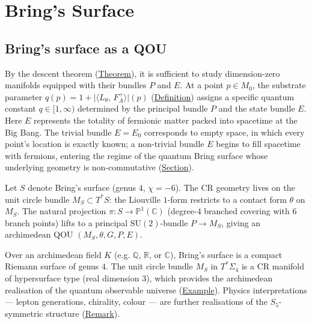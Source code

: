 \chapter{Bring's Surface}
\label{chap:brings-surface}

\section{Bring's surface as a QOU}
\label{sec:brings-qou}

\begin{remark}
  \label{rem:descent-to-zero}
By the descent theorem (\hyperref[thm:descartes]{Theorem}), it is sufficient
to study dimension-zero manifolds equipped with their bundles $P$ and $E$.
At a point $p\in M_0$, the substrate parameter
$q(p)= 1 + \lvert\langle L_\theta,\, F_A^{+}\rangle\rvert(p)$
(\hyperref[def:substrate-parameter]{Definition}) assigns a specific quantum
constant $q\in[1,\infty)$ determined by the principal bundle $P$ and the
state bundle $E$.  Here $E$ represents the totality of fermionic matter
packed into spacetime at the Big Bang.  The trivial bundle $E=E_0$
corresponds to empty space, in which every point's location is exactly
known; a non-trivial bundle $E$ begins to fill spacetime with fermions,
entering the regime of the quantum Bring surface whose underlying geometry
is non-commutative (\hyperref[sec:quantum-brings]{Section}).
\end{remark}

\begin{example}
  \label{ex:brings-surface}
Let $S$ denote Bring's surface (genus $4$, $\chi = -6$).  The CR geometry
lives on the unit circle bundle $M_S \subset T^*S$: the Liouville
$1$-form restricts to a contact form $\theta$ on $M_S$.  The natural
projection $\pi \colon S \to \mathbb{P}^1(\mathbb{C})$ (degree-$4$
branched covering with $6$ branch points) lifts to a principal
$\mathrm{SU}(2)$-bundle $P \to M_S$, giving an archimedean QOU
$(M_S, \theta, G, P, E)$.
\end{example}

\begin{remark}
  \label{rem:brings-realisations}
Over an archimedean field $K$ (e.g. $\mathbb{Q}$, $\mathbb{R}$, or
$\mathbb{C}$), Bring's surface is a compact Riemann surface of genus $4$.
The unit circle bundle $M_S$ in $T^*\Sigma_4$ is a CR manifold of
hypersurface type (real dimension $3$), which provides the archimedean
realisation of the quantum observable universe
(\hyperref[def:c-quantum-universe]{Example}).  Physics interpretations --- lepton
generations, chirality, colour --- are further realisations of the
$S_5$-symmetric structure (\hyperref[rem:descartes-leptons]{Remark}).
\end{remark}

